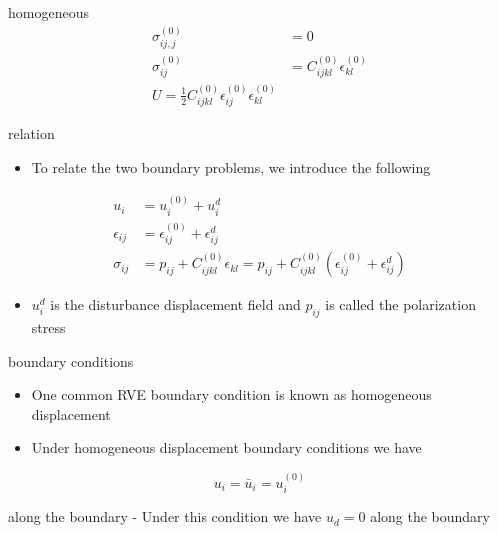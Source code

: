 \documentclass[
  letterpaper,
  ignorenonframetext,
  aspectratio=43,
  handout,
  12pt]{beamer}
\providecommand{\tightlist}{%
  \setlength{\itemsep}{0pt}\setlength{\parskip}{0pt}}
\providecommand{\tightlist}{%
\setlength{\itemsep}{0pt}\setlength{\parskip}{0pt}}
\begin{document}
\begin{frame}{homogeneous}
\protect\hypertarget{homogeneous}{}
\[\begin{aligned}
        \sigma_{ij,j}^{(0)} &= 0\\
        \sigma_{ij}^{(0)} &= C_{ijkl}^{(0)} \epsilon_{kl}^{(0)}\\
        U = \frac{1}{2} C_{ijkl}^{(0)} \epsilon_{ij}^{(0)}\epsilon_{kl}^{(0)}
\end{aligned}\]
\end{frame}

\begin{frame}{relation}
\protect\hypertarget{relation}{}
\begin{itemize}
\tightlist
\item
  To relate the two boundary problems, we introduce the following
\end{itemize}

\[\begin{aligned}
   u_i &= u_i^{(0)} + u_i^d\\
   \epsilon_{ij} &= \epsilon_{ij}^{(0)} + \epsilon_{ij}^d\\
   \sigma_{ij} &= p_{ij} + C_{ijkl}^{(0)} \epsilon_{kl} = p_{ij} + C_{ijkl}^{(0)}(\epsilon_{ij}^{(0)} + \epsilon_{ij}^d)
\end{aligned}\]

\begin{itemize}
\tightlist
\item
  \(u_i^d\) is the disturbance displacement field and \(p_{ij}\) is
  called the polarization stress
\end{itemize}
\end{frame}

\begin{frame}{boundary conditions}
\protect\hypertarget{boundary-conditions}{}
\begin{itemize}
\tightlist
\item
  One common RVE boundary condition is known as homogeneous displacement
\item
  Under homogeneous displacement boundary conditions we have
\end{itemize}

\[u_i = \bar{u}_i = u_i^{(0)}\]

along the boundary - Under this condition we have \(u_d=0\) along the
boundary
\end{frame}
\end{document}
